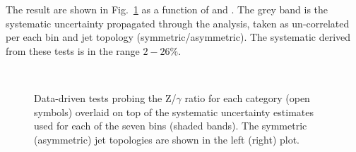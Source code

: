 The result are shown in Fig.~\ref{fig:closurePhoToMuMu} as a function of \scalht and \njet. 
The grey band is the systematic uncertainty propagated through the analysis, 
taken as un-correlated per each \scalht bin and jet topology (symmetric/asymmetric). The systematic derived from these tests is
in the range $2-26\%$.


\begin{figure}[h!]
  \begin{center}
    ~~
    \caption{Data-driven tests probing the Z/$\gamma$ ratio for each
      \njet category (open symbols) overlaid on top of the systematic
      uncertainty estimates used for each of the seven \scalht bins
      (shaded bands). 
      The symmetric (asymmetric) jet topologies are shown in the left (right) plot.      
    }
    \label{fig:closurePhoToMuMu}
  \end{center} 
\end{figure}





